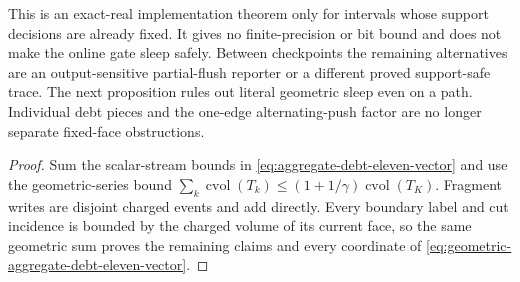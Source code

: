 \begin{corollary}
This is an exact-real implementation theorem only for intervals whose support
decisions are already fixed.  It gives no finite-precision or bit bound and
does not make the online gate sleep safely.  Between checkpoints the remaining
alternatives are an output-sensitive partial-flush reporter or a different
proved support-safe trace.  The next proposition rules out literal geometric
sleep even on a path.  Individual debt pieces and the one-edge
alternating-push factor are no longer separate fixed-face obstructions.
\end{corollary}

\begin{proof}
Sum the scalar-stream bounds in
\cref{eq:aggregate-debt-eleven-vector} and use the geometric-series bound
$\sum_k\operatorname{cvol}(T_k)\leq
(1+1/\gamma)\operatorname{cvol}(T_K)$.  Fragment writes are disjoint charged
events and add directly.  Every boundary label and cut incidence is bounded by
the charged volume of its current face, so the same geometric sum proves the
remaining claims and every coordinate of
\cref{eq:geometric-aggregate-debt-eleven-vector}.
\end{proof}

